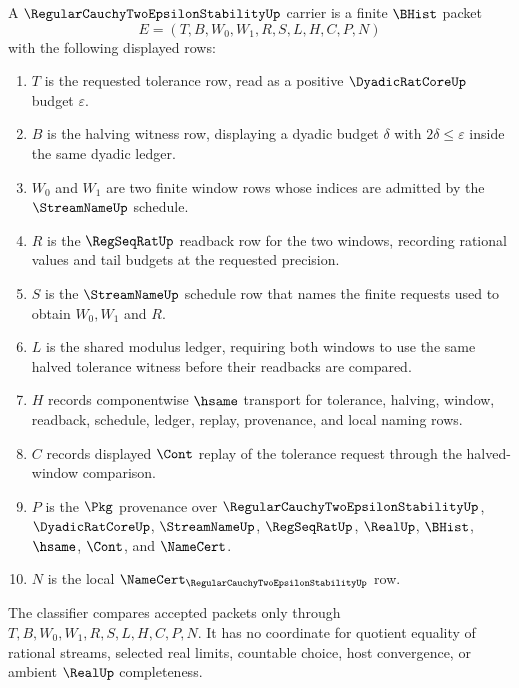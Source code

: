 \begin{definition}
\label{def:regular-cauchy-two-epsilon-stability-carrier}
A $\RegularCauchyTwoEpsilonStabilityUp$ carrier is a finite $\BHist$ packet
$$
E=(T,B,W_0,W_1,R,S,L,H,C,P,N)
$$
with the following displayed rows:
\begin{enumerate}
\item $T$ is the requested tolerance row, read as a positive $\DyadicRatCoreUp$ budget $\varepsilon$.
\item $B$ is the halving witness row, displaying a dyadic budget $\delta$ with $2\delta\leq\varepsilon$ inside the same dyadic ledger.
\item $W_0$ and $W_1$ are two finite window rows whose indices are admitted by the $\StreamNameUp$ schedule.
\item $R$ is the $\RegSeqRatUp$ readback row for the two windows, recording rational values and tail budgets at the requested precision.
\item $S$ is the $\StreamNameUp$ schedule row that names the finite requests used to obtain $W_0,W_1$ and $R$.
\item $L$ is the shared modulus ledger, requiring both windows to use the same halved tolerance witness before their readbacks are compared.
\item $H$ records componentwise $\hsame$ transport for tolerance, halving, window, readback, schedule, ledger, replay, provenance, and local naming rows.
\item $C$ records displayed $\Cont$ replay of the tolerance request through the halved-window comparison.
\item $P$ is the $\Pkg$ provenance over $\RegularCauchyTwoEpsilonStabilityUp$, $\DyadicRatCoreUp$, $\StreamNameUp$, $\RegSeqRatUp$, $\RealUp$, $\BHist$, $\hsame$, $\Cont$, and $\NameCert$.
\item $N$ is the local $\NameCert_{\RegularCauchyTwoEpsilonStabilityUp}$ row.
\end{enumerate}
The classifier compares accepted packets only through $T,B,W_0,W_1,R,S,L,H,C,P,N$. It has no coordinate for quotient equality of rational streams, selected real limits, countable choice, host convergence, or ambient $\RealUp$ completeness.
\end{definition}

